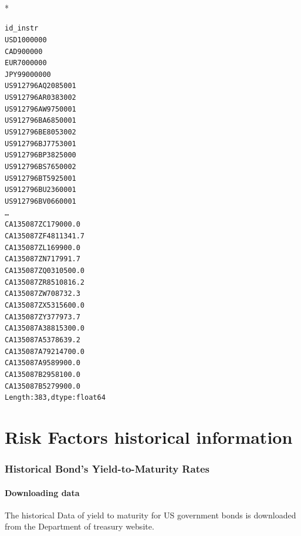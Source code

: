 \documentclass[letterpaper,10pt,english]{/anaconda/lib/python2.7/site-packages/sphinx/texinputs/sphinxhowto}
\def\smaller{\fontsize{9.5pt}{9.5pt}\selectfont}
\newenvironment{InvisibleVerbatim}
        {\begin{mdframed}[leftmargin=0.1\linewidth,innerleftmargin=3pt,innerrightmargin=3pt, userdefinedwidth=1\linewidth, linewidth=0pt, linecolor=white, usetwoside=false]}
        {\end{mdframed}}
\begin{document}
    

        
        

            
                \makebox[0.1\linewidth]{\smaller\hfill\tt\color{nbframe-out-prompt}Out\hspace{4pt}{[}3{]}:\hspace{4pt}}\\*
                \vspace{-2.55\baselineskip}\begin{InvisibleVerbatim}
                \vspace{-0.5\baselineskip}
\begin{alltt}id\_instr
USD              1000000
CAD               900000
EUR              7000000
JPY             99000000
US912796AQ20       85001
US912796AR03       83002
US912796AW97       50001
US912796BA68       50001
US912796BE80       53002
US912796BJ77       53001
US912796BP38       25000
US912796BS76       50002
US912796BT59       25001
US912796BU23       60001
US912796BV06       60001
\ldots
CA135087ZC17     9000.0
CA135087ZF48    11341.7
CA135087ZL16     9900.0
CA135087ZN71     7991.7
CA135087ZQ03    10500.0
CA135087ZR85    10816.2
CA135087ZW70     8732.3
CA135087ZX53    15600.0
CA135087ZY37     7973.7
CA135087A388    15300.0
CA135087A537     8639.2
CA135087A792    14700.0
CA135087A958     9900.0
CA135087B295     8100.0
CA135087B527     9900.0
Length: 383, dtype: float64\end{alltt}

            \end{InvisibleVerbatim}
            
        
    
\part{Risk Factors historical information}\section{Historical Bond's Yield-to-Maturity Rates}\subsection{Downloading data}The historical Data of yield to maturity for US government bonds is
downloaded from the Department of treasury website.
\end{document}
